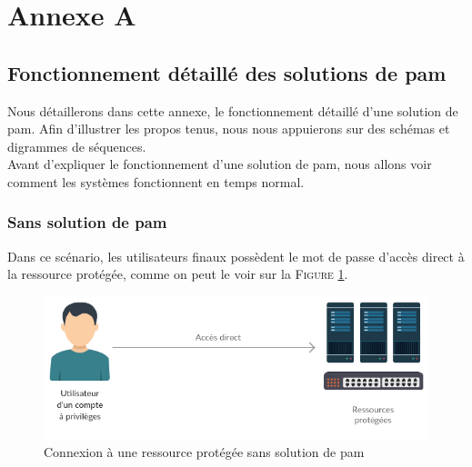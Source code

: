 \setcounter{section}{1}
\section*{Annexe A}
\label{annexe:A}

\subsection{Fonctionnement détaillé des solutions de \gls{pam}}

Nous détaillerons dans cette annexe, le fonctionnement détaillé d'une solution de \gls{pam}. Afin d'illustrer les propos tenus, nous nous appuierons sur des schémas et digrammes de séquences.\\
Avant d'expliquer le fonctionnement d'une solution de \gls{pam}, nous allons voir comment les systèmes fonctionnent en temps normal.

\subsubsection{Sans solution de \gls{pam}}
\label{par:nopam}

Dans ce scénario, les utilisateurs finaux possèdent le mot de passe d'accès direct à la ressource protégée, comme on peut le voir sur la \textsc{Figure} \ref{fig:sans_PAM}.

\begin{figure}[!ht]
    \center
    \includegraphics[width=\textwidth]{./images/Schema_ultra_light_sans_PAM.png}
    \caption{Connexion à une ressource protégée sans solution de \gls{pam}}
    \label{fig:sans_PAM}
\end{figure}

